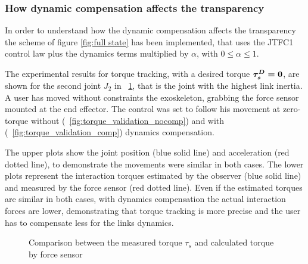 \subsubsection{How dynamic compensation affects the transparency} \label{subsubsec:compensationAndTransparency}

In order to understand how the dynamic compensation affects the transparency the scheme of figure \ref{fig:full state} has been implemented, that uses the JTFC1 control law plus the dynamics terms multiplied by $\alpha$, with $0 \leq \alpha \leq 1$.

The experimental results for torque tracking, with a desired torque ${ \boldsymbol {\tau_s^D=0}}$, are shown for the second joint $J_2$ in \figurename \ \ref{fig:torque_validation}, that is the joint with the highest link inertia. A user has moved without constraints the exoskeleton, grabbing the force sensor mounted at the end effector. The control was set to follow his movement at zero-torque without (\figurename \ \ref{fig:torque_validation_nocomp}) and with (\figurename \ \ref{fig:torque_validation_comp}) dynamics compensation. 
\par The upper plots show the joint position (blue solid line) and acceleration (red dotted line), to demonstrate the movements were similar in both cases. The lower plots represent the interaction torques estimated by the observer (blue solid line) and measured by the force sensor (red dotted line). Even if the estimated torques are similar in both cases, with dynamics compensation the actual interaction forces are lower, demonstrating that torque tracking is more precise and the user has to compensate less for the links dynamics.

\begin{figure}[htb]
	\centering
	\caption{Comparison between the measured torque $\tau_s$ and calculated torque by force sensor}
	\label{fig:torque_validation}
\end{figure}



